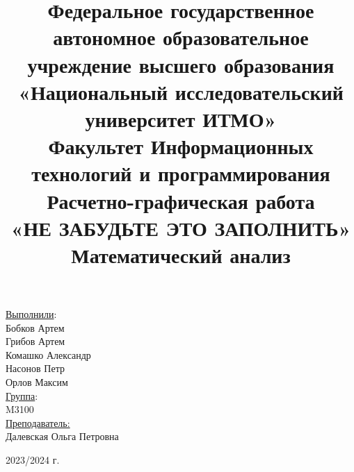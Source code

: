 \title{Федеральное государственное автономное образовательное учреждение высшего образования\\
«Национальный исследовательский университет ИТМО»\\
Факультет Информационных технологий и программирования\\[2\baselineskip]
Расчетно-графическая работа\\
\textbf{«НЕ ЗАБУДЬТЕ ЭТО ЗАПОЛНИТЬ»}\\
Математический анализ\\
}
\date{}
\author{}

\maketitle

\thispagestyle{empty}
\vfill
\begin{flushright}
  \begin{large}
\underline{Выполнили}:\\
Бобков Артем\\
Грибов Артем\\
Комашко Александр\\
Насонов Петр\\
Орлов Максим\\[1\baselineskip]

\underline{Группа}:\\
M3100\\[1\baselineskip]
\underline{Преподаватель:}\\
Далевская Ольга Петровна\\[3\baselineskip]

\end{large}

\end{flushright}
\begin{center} \begin{normalsize} 2023/2024 г. \\\end{normalsize} \end{center}

\clearpage

\pagestyle{plain}

